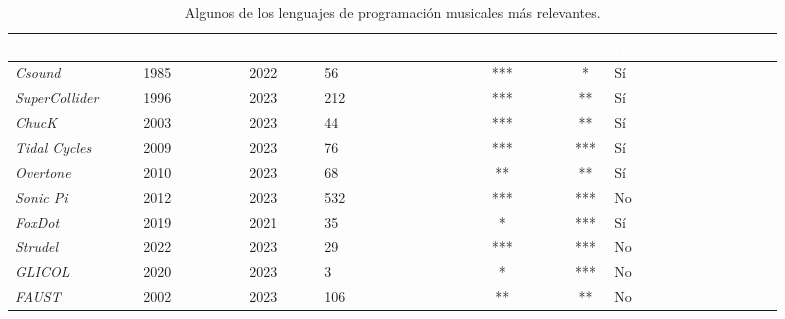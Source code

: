\begin{table}[htbp]
  \centering
  \caption[Algunos de los lenguajes de programación musicales más relevantes]{Algunos de los lenguajes de programación musicales más relevantes.}
  \label{tab:lenguajes_comparativa}
  \fontsize{9.5pt}{11pt}\selectfont
  \begingroup
  \begin{tabularx}{\linewidth}{|l|c|c|l|c|c|l|}
      \toprule
      \rowcolor{azul_unir} %
      \textcolor{white}{\textbf{Lenguaje}} & \textcolor{white}{\textbf{Lanzamiento}} & \textcolor{white}{\textbf{Actualización}} & \textcolor{white}{\textbf{Desarrolladores}} & \textcolor{white}{\textbf{Documentación}} & \textcolor{white}{\textbf{\emph{Live}}} & \textcolor{white}{\textbf{Independiente de IDE}} \\
      \midrule
      \emph{Csound} & 1985 & 2022 & 56 & *** & * & Sí \\
      \emph{SuperCollider} & 1996 & 2023 & 212 & *** & ** & Sí \\
      \emph{ChucK} & 2003 & 2023 & 44 & *** & ** & Sí \\
      \emph{Tidal Cycles} & 2009 & 2023 & 76 & *** & *** & Sí \\
      \emph{Overtone} & 2010 & 2023 & 68 & ** & ** & Sí \\
      \emph{Sonic Pi} & 2012 & 2023 & 532 & *** & *** & No \\
      \emph{FoxDot} & 2019 & 2021 & 35 & * & *** & Sí \\
      \emph{Strudel} & 2022 & 2023 & 29 & *** & *** & No \\
      \emph{GLICOL} & 2020 & 2023 & 3 & * & *** & No\\ %
      \emph{FAUST} & 2002 & 2023 & 106 & ** & ** & No\\ %
      \bottomrule
  \end{tabularx}
  \endgroup
  \source{\propio}
\end{table}